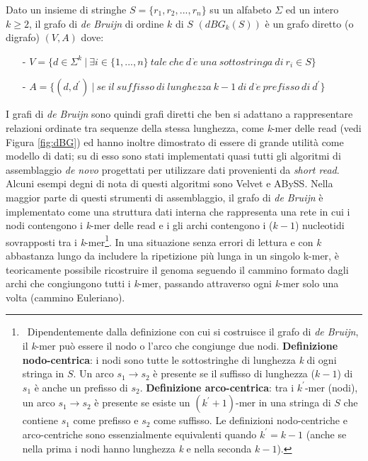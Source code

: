 \documentclass[../main.tex]{subfiles}
\begin{document}
\theoremstyle{definition}
\begin{definition} 
Dato un insieme di stringhe $S = \{r_1 , r_2 , ... , r_n\}$ su un alfabeto $\Sigma$ ed un intero $k\geq2$, il grafo di \textit{de Bruijn} di ordine $k$ di $S$ $(dBG_k (S))$ è un grafo diretto (o digrafo) $(V,A)$ dove:
\begin{itemize}
\item[-] $V = \{d \in \Sigma^k \ |\  \exists i \in \{1, ..., n\} \ tale\ che\ d\ \grave{e}\ una\ sottostringa\ di\ r_i \in S\}$
\item[-]$A = \{ (d,d^\prime)\ |\ se\ il\ suffisso\ di\ lunghezza\ k-1\ di\ d\ \grave{e}\ prefisso\ di\ d^\prime\}$
\end{itemize}
\end{definition}

\noindent
I grafi di \textit{de Bruijn} sono quindi grafi diretti che ben si adattano a rappresentare relazioni ordinate tra sequenze della stessa lunghezza, come \textit{k}-mer delle read (vedi Figura \ref{fig:dBG}) ed hanno inoltre dimostrato di essere di grande utilità come modello di dati; su di esso sono stati implementati quasi tutti gli algoritmi di assemblaggio \textit{de novo} progettati per utilizzare dati provenienti da \textit{short read}. Alcuni esempi degni di nota di questi algoritmi sono Velvet e ABySS. Nella maggior parte di questi strumenti di assemblaggio, il grafo di \textit{de Bruijn} è implementato come una struttura dati interna che rappresenta una rete in cui i nodi contengono i \textit{k}-mer delle read e i gli archi contengono i ($k-1$) nucleotidi sovrapposti tra i \textit{k}-mer\footnote{\ Dipendentemente dalla definizione con cui si costruisce il grafo di \textit{de Bruijn}, il \textit{k}-mer può essere il nodo o l'arco che congiunge due nodi. \textbf{Definizione nodo-centrica}: i nodi sono tutte le sottostringhe di lunghezza \textit{k} di ogni stringa in $S$. Un arco $s_1 \rightarrow s_2$ è presente se il suffisso di lunghezza ($k-1$) di $s_1$ è anche un prefisso di $s_2$. \textbf{Definizione arco-centrica}: tra i $k^\prime$-mer (nodi), un arco $s_1 \rightarrow s_2$ è presente se esiste un $(k^\prime+1)$-mer in una stringa di $S$ che contiene $s_1$ come prefisso e $s_2$ come suffisso. Le definizioni nodo-centriche e arco-centriche sono essenzialmente equivalenti quando $k^\prime = k-1$ (anche se nella prima i nodi hanno lunghezza \textit{k} e nella seconda $k - 1$).}. In una situazione senza errori di lettura e con \textit{k} abbastanza lungo da includere la ripetizione più lunga in un singolo k-mer, è teoricamente possibile ricostruire il genoma seguendo il cammino formato dagli archi che congiungono tutti i \textit{k}-mer, passando attraverso ogni \textit{k}-mer solo una volta (cammino Euleriano). 
\end{document}

